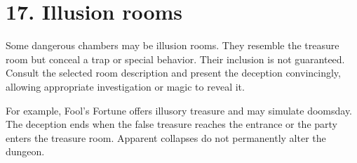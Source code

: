 \section{17. Illusion rooms}

Some dangerous chambers may be illusion rooms. They resemble the treasure room but conceal a trap or special behavior. Their inclusion is not guaranteed. Consult the selected room description and present the deception convincingly, allowing appropriate investigation or magic to reveal it.

For example, Fool's Fortune offers illusory treasure and may simulate doomsday. The deception ends when the false treasure reaches the entrance or the party enters the treasure room. Apparent collapses do not permanently alter the dungeon.

